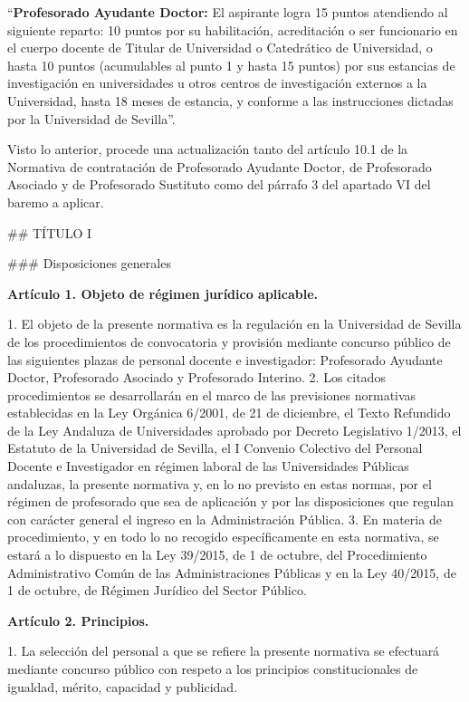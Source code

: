 \documentclass{article}
\begin{document}
\begin{itemize}
\begin{itemize}
\begin{scriptsize}
                  “\textbf{Profesorado Ayudante Doctor:} El aspirante logra 15 puntos atendiendo al siguiente reparto: 10 puntos por su habilitación, acreditación o ser funcionario en el cuerpo docente de Titular de Universidad o Catedrático de Universidad, o hasta 10 puntos (acumulables al punto 1 y hasta 15 puntos) por sus estancias de investigación en universidades u otros centros de investigación externos a la Universidad, hasta 18 meses de estancia, y conforme a las instrucciones dictadas por la Universidad de Sevilla”.

                  Visto lo anterior, procede una actualización tanto del artículo 10.1 de la Normativa de contratación de Profesorado Ayudante Doctor, de Profesorado Asociado y de Profesorado Sustituto como del párrafo 3 del apartado VI del baremo a aplicar.

                  \#\# TÍTULO I

                  \#\#\# Disposiciones generales

                  \textbf{Artículo 1. Objeto de régimen jurídico aplicable.}

                  1. El objeto de la presente normativa es la regulación en la Universidad de Sevilla de los procedimientos de convocatoria y provisión mediante concurso público de las siguientes plazas de personal docente e investigador: Profesorado Ayudante Doctor, Profesorado Asociado y Profesorado Interino.
                  2. Los citados procedimientos se desarrollarán en el marco de las previsiones normativas establecidas en la Ley Orgánica 6/2001, de 21 de diciembre, el Texto Refundido de la Ley Andaluza de Universidades aprobado por Decreto Legislativo 1/2013, el Estatuto de la Universidad de Sevilla, el I Convenio Colectivo del Personal Docente e Investigador en régimen laboral de las Universidades Públicas andaluzas, la presente normativa y, en lo no previsto en estas normas, por el régimen de profesorado que sea de aplicación y por las disposiciones que regulan con carácter general el ingreso en la Administración Pública.
                  3. En materia de procedimiento, y en todo lo no recogido específicamente en esta normativa, se estará a lo dispuesto en la Ley 39/2015, de 1 de octubre, del Procedimiento Administrativo Común de las Administraciones Públicas y en la Ley 40/2015, de 1 de octubre, de Régimen Jurídico del Sector Público.

                  \textbf{Artículo 2. Principios.}

                  1. La selección del personal a que se refiere la presente normativa se efectuará mediante concurso público con respeto a los principios constitucionales de igualdad, mérito, capacidad y publicidad.


\end{scriptsize}
\end{itemize}
\end{itemize}
\end{document}
